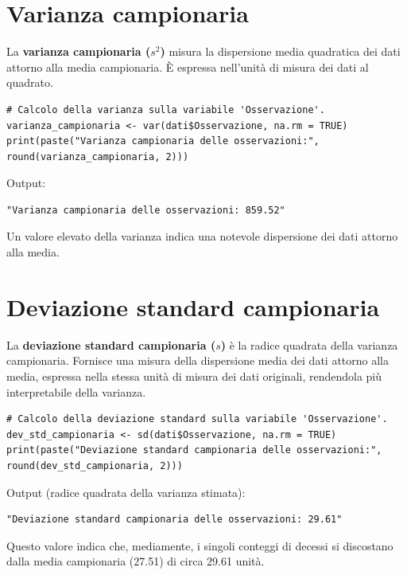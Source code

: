 \documentclass[14pt, openany, titlepage]{report} %
\begin{document}
\section{Varianza campionaria}
La \textbf{varianza campionaria ($s^2$)} misura la dispersione
media quadratica dei dati attorno alla media campionaria.
È espressa nell'unità di misura dei dati al quadrato.
\begin{center}
\begin{lstlisting}[breaklines=true]
# Calcolo della varianza sulla variabile 'Osservazione'.
varianza_campionaria <- var(dati$Osservazione, na.rm = TRUE)
print(paste("Varianza campionaria delle osservazioni:", round(varianza_campionaria, 2)))
\end{lstlisting}
\end{center}
\noindent
Output:
\begin{verbatim}
"Varianza campionaria delle osservazioni: 859.52" 
\end{verbatim}
Un valore elevato della varianza indica una notevole
 dispersione dei dati attorno alla media.
    
\section{Deviazione standard campionaria}
La \textbf{deviazione standard campionaria ($s$)} è la radice quadrata 
della varianza campionaria. Fornisce una misura della dispersione
 media dei dati attorno alla media, espressa nella stessa unità 
 di misura dei dati originali, rendendola più interpretabile 
 della varianza.
\begin{center}
\begin{lstlisting}[breaklines=true]
# Calcolo della deviazione standard sulla variabile 'Osservazione'.
dev_std_campionaria <- sd(dati$Osservazione, na.rm = TRUE)
print(paste("Deviazione standard campionaria delle osservazioni:", round(dev_std_campionaria, 2)))
\end{lstlisting}
\end{center}
\noindent
Output (radice quadrata della varianza stimata):
\begin{verbatim}
"Deviazione standard campionaria delle osservazioni: 29.61"
\end{verbatim}
Questo valore indica che, mediamente, i singoli conteggi di 
decessi si discostano dalla media campionaria (27.51) di 
circa 29.61 unità.
    
\end{document}
